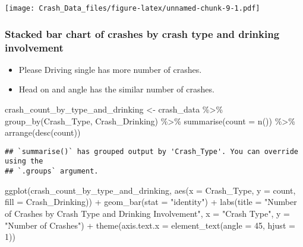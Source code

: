 \documentclass[
]{article}
\newenvironment{Shaded}{\begin{snugshade}}{\end{snugshade}}
\newcommand{\AttributeTok}[1]{\textcolor[rgb]{0.77,0.63,0.00}{#1}}
\newcommand{\DecValTok}[1]{\textcolor[rgb]{0.00,0.00,0.81}{#1}}
\newcommand{\FunctionTok}[1]{\textcolor[rgb]{0.00,0.00,0.00}{#1}}
\newcommand{\NormalTok}[1]{#1}
\newcommand{\OtherTok}[1]{\textcolor[rgb]{0.56,0.35,0.01}{#1}}
\newcommand{\SpecialCharTok}[1]{\textcolor[rgb]{0.00,0.00,0.00}{#1}}
\newcommand{\StringTok}[1]{\textcolor[rgb]{0.31,0.60,0.02}{#1}}
\providecommand{\tightlist}{%
  \setlength{\itemsep}{0pt}\setlength{\parskip}{0pt}}
\begin{document}
\texttt{[image: Crash\_Data\_files/figure-latex/unnamed-chunk-9-1.pdf]}

\hypertarget{stacked-bar-chart-of-crashes-by-crash-type-and-drinking-involvement}{%
\subsubsection{Stacked bar chart of crashes by crash type and drinking
involvement}\label{stacked-bar-chart-of-crashes-by-crash-type-and-drinking-involvement}}

\begin{itemize}
\tightlist
\item
  Please Driving single has more number of crashes.
\item
  Head on and angle has the similar number of crashes.
\end{itemize}

\begin{Shaded}
\begin{Highlighting}[]
\NormalTok{crash\_count\_by\_type\_and\_drinking }\OtherTok{\textless{}{-}}\NormalTok{ crash\_data }\SpecialCharTok{\%\textgreater{}\%}
  \FunctionTok{group\_by}\NormalTok{(Crash\_Type, Crash\_Drinking) }\SpecialCharTok{\%\textgreater{}\%}
  \FunctionTok{summarise}\NormalTok{(}\AttributeTok{count =} \FunctionTok{n}\NormalTok{()) }\SpecialCharTok{\%\textgreater{}\%}
  \FunctionTok{arrange}\NormalTok{(}\FunctionTok{desc}\NormalTok{(count))}
\end{Highlighting}
\end{Shaded}

\begin{verbatim}
## `summarise()` has grouped output by 'Crash_Type'. You can override using the
## `.groups` argument.
\end{verbatim}

\begin{Shaded}
\begin{Highlighting}[]
\FunctionTok{ggplot}\NormalTok{(crash\_count\_by\_type\_and\_drinking, }\FunctionTok{aes}\NormalTok{(}\AttributeTok{x =}\NormalTok{ Crash\_Type, }\AttributeTok{y =}\NormalTok{ count, }\AttributeTok{fill =}\NormalTok{ Crash\_Drinking)) }\SpecialCharTok{+}
  \FunctionTok{geom\_bar}\NormalTok{(}\AttributeTok{stat =} \StringTok{"identity"}\NormalTok{) }\SpecialCharTok{+}
  \FunctionTok{labs}\NormalTok{(}\AttributeTok{title =} \StringTok{"Number of Crashes by Crash Type and Drinking Involvement"}\NormalTok{, }\AttributeTok{x =} \StringTok{"Crash Type"}\NormalTok{, }\AttributeTok{y =} \StringTok{"Number of Crashes"}\NormalTok{) }\SpecialCharTok{+}
  \FunctionTok{theme}\NormalTok{(}\AttributeTok{axis.text.x =} \FunctionTok{element\_text}\NormalTok{(}\AttributeTok{angle =} \DecValTok{45}\NormalTok{, }\AttributeTok{hjust =} \DecValTok{1}\NormalTok{))}
\end{Highlighting}
\end{Shaded}
\end{document}
